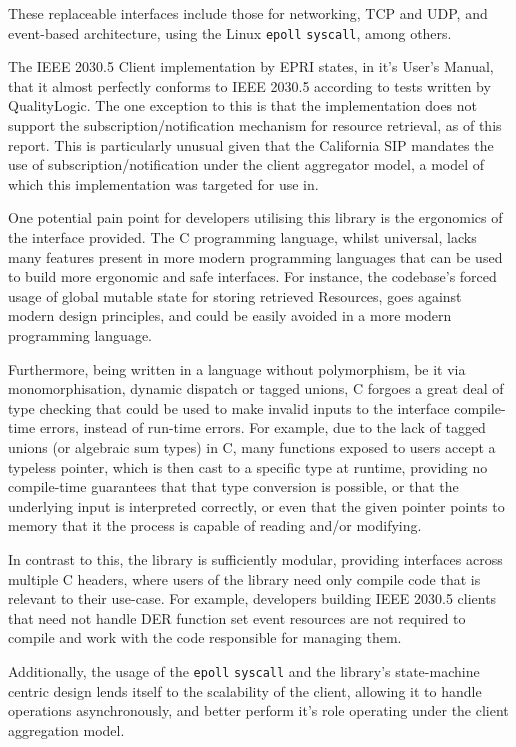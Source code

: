 These replaceable interfaces include those for networking, TCP and UDP, and event-based architecture, using the Linux \texttt{epoll} \texttt{syscall}, among others.

The IEEE 2030.5 Client implementation by EPRI states, in it's User's Manual, that it almost perfectly conforms to IEEE 2030.5 according to tests written by QualityLogic.
The one exception to this is that the implementation does not support the subscription/notification mechanism for resource retrieval, as of this report.
This is particularly unusual given that the California SIP mandates the use of subscription/notification under the client aggregator model, a model of which this implementation was targeted for use in.

One potential pain point for developers utilising this library is the ergonomics of the interface provided. The C programming language, whilst universal, lacks many features present in more modern programming languages that can be used to build more ergonomic and safe interfaces. For instance, the codebase's forced usage of global mutable state for storing retrieved Resources, goes against modern design principles, and could be easily avoided in a more modern programming language. 

Furthermore, being written in a language without polymorphism, be it via monomorphisation, dynamic dispatch or tagged unions, C forgoes a great deal of type checking that could be used to make invalid inputs to the interface compile-time errors, instead of run-time errors. For example, due to the lack of tagged unions (or algebraic sum types) in C, many functions exposed to users accept a typeless pointer, which is then cast to a specific type at runtime, providing no compile-time guarantees that that type conversion is possible, or that the underlying input is interpreted correctly, or even that the given pointer points to memory that it the process is capable of reading and/or modifying.

In contrast to this, the library is sufficiently modular, providing interfaces across multiple C headers, where users of the library need only compile code that is relevant to their use-case. For example, developers building IEEE 2030.5 clients that need not handle DER function set event resources are not required to compile and work with the code responsible for managing them.

Additionally, the usage of the \texttt{epoll} \texttt{syscall} and the library's state-machine centric design lends itself to the scalability of the client, allowing it to handle operations asynchronously, and better perform it's role operating under the client aggregation model. \cite[]{eprimanual}

